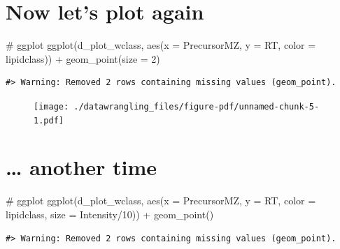 \documentclass[
  letterpaper,
  DIV=11,
  numbers=noendperiod]{scrreprt}
\newenvironment{Shaded}{\begin{snugshade}}{\end{snugshade}}
\newcommand{\AttributeTok}[1]{\textcolor[rgb]{0.40,0.45,0.13}{#1}}
\newcommand{\CommentTok}[1]{\textcolor[rgb]{0.37,0.37,0.37}{#1}}
\newcommand{\DecValTok}[1]{\textcolor[rgb]{0.68,0.00,0.00}{#1}}
\newcommand{\FunctionTok}[1]{\textcolor[rgb]{0.28,0.35,0.67}{#1}}
\newcommand{\NormalTok}[1]{\textcolor[rgb]{0.00,0.23,0.31}{#1}}
\newcommand{\SpecialCharTok}[1]{\textcolor[rgb]{0.37,0.37,0.37}{#1}}
\begin{document}
\hypertarget{now-lets-plot-again}{%
\section{Now let's plot again}\label{now-lets-plot-again}}

\begin{Shaded}
\begin{Highlighting}[]
\CommentTok{\# ggplot}
\FunctionTok{ggplot}\NormalTok{(d\_plot\_wclass, }\FunctionTok{aes}\NormalTok{(}\AttributeTok{x =}\NormalTok{ PrecursorMZ, }\AttributeTok{y =}\NormalTok{ RT, }\AttributeTok{color =}\NormalTok{ lipidclass)) }\SpecialCharTok{+}
  \FunctionTok{geom\_point}\NormalTok{(}\AttributeTok{size =} \DecValTok{2}\NormalTok{)}
\end{Highlighting}
\end{Shaded}

\begin{verbatim}
#> Warning: Removed 2 rows containing missing values (geom_point).
\end{verbatim}

\begin{figure}[H]

{\centering \texttt{[image: ./datawrangling\_files/figure-pdf/unnamed-chunk-5-1.pdf]}

}

\end{figure}

\hypertarget{another-time}{%
\section{\ldots{} another time}\label{another-time}}

\begin{Shaded}
\begin{Highlighting}[]
\CommentTok{\# ggplot}
\FunctionTok{ggplot}\NormalTok{(d\_plot\_wclass, }\FunctionTok{aes}\NormalTok{(}\AttributeTok{x =}\NormalTok{ PrecursorMZ, }\AttributeTok{y =}\NormalTok{ RT, }\AttributeTok{color =}\NormalTok{ lipidclass, }\AttributeTok{size =}\NormalTok{ Intensity}\SpecialCharTok{/}\DecValTok{10}\NormalTok{)) }\SpecialCharTok{+}
  \FunctionTok{geom\_point}\NormalTok{()}
\end{Highlighting}
\end{Shaded}

\begin{verbatim}
#> Warning: Removed 2 rows containing missing values (geom_point).
\end{verbatim}
\end{document}
